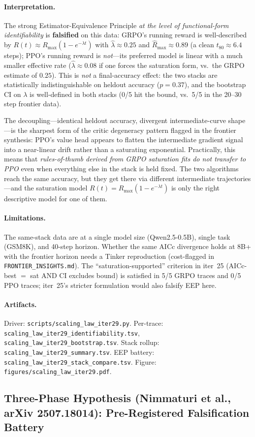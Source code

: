 \documentclass{article}
\begin{document}
\paragraph{Interpretation.}
The strong Estimator-Equivalence Principle \emph{at the level of
functional-form identifiability} is \textbf{falsified} on this data:
GRPO's running reward is well-described by
$R(t)\approx R_{\max}(1-e^{-\lambda t})$ with $\hat\lambda\approx 0.25$
and $\hat R_{\max}\approx 0.89$ (a clean $t_{80}\approx 6.4$ steps);
PPO's running reward is \emph{not}---its preferred model is linear with
a much smaller effective rate ($\hat\lambda\approx 0.08$ if one forces
the saturation form, vs.\ the GRPO estimate of $0.25$). This is
\emph{not} a final-accuracy effect: the two stacks are statistically
indistinguishable on heldout accuracy ($p=0.37$), and the bootstrap CI
on $\lambda$ is well-defined in both stacks (0/5 hit the bound, vs.\
5/5 in the 20--30 step frontier data).

The decoupling---identical heldout accuracy, divergent
intermediate-curve shape---is the sharpest form of the critic
degeneracy pattern flagged in the frontier synthesis: PPO's value
head appears to flatten the intermediate gradient signal into a
near-linear drift rather than a saturating exponential. Practically,
this means that \emph{rules-of-thumb derived from GRPO saturation fits
do not transfer to PPO} even when everything else in the stack is held
fixed. The two algorithms reach the same accuracy, but they get there
via different intermediate trajectories---and the saturation model
$R(t)=R_{\max}(1-e^{-\lambda t})$ is only the right descriptive model
for one of them.

\paragraph{Limitations.}
The same-stack data are at a single model size (Qwen2.5-0.5B), single
task (GSM8K), and 40-step horizon. Whether the same AICc divergence
holds at 8B+ with the frontier horizon needs a Tinker reproduction
(cost-flagged in \texttt{FRONTIER\_INSIGHTS.md}). The
``saturation-supported'' criterion in iter~25 (AICc-best $=$ sat AND
CI excludes bound) is satisfied in 5/5 GRPO traces and 0/5 PPO traces;
iter~25's stricter formulation would also falsify EEP here.

\paragraph{Artifacts.}
Driver: \texttt{scripts/scaling\_law\_iter29.py}.
Per-trace: \texttt{scaling\_law\_iter29\_identifiability.tsv},
\texttt{scaling\_law\_iter29\_bootstrap.tsv}.
Stack rollup: \texttt{scaling\_law\_iter29\_summary.tsv}.
EEP battery: \texttt{scaling\_law\_iter29\_stack\_compare.tsv}.
Figure: \texttt{figures/scaling\_law\_iter29.pdf}. \subsection{Three-Phase Hypothesis (Nimmaturi et al., arXiv 2507.18014): Pre-Registered Falsification Battery}
\label{sec:scaling-law-iter33}
\end{document}
